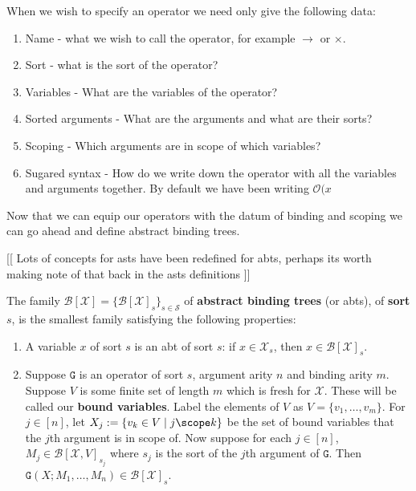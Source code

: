 \begin{remark}\label{opdata}
    When we wish to specify an operator we need only give the following data:
    \begin{enumerate}
        \item Name - what we wish to call the operator, for example $\to$ or $\times$.
        \item Sort - what is the sort of the operator?
        \item Variables - What are the variables of the operator?
        \item Sorted arguments - What are the arguments and what are their sorts?
        \item Scoping - Which arguments are in scope of which variables?
        \item Sugared syntax - How do we write down the operator with all the variables and arguments together. By default we have been writing $\mathcal{O}(x$ 
    \end{enumerate}
\end{remark}

Now that we can equip our operators with the datum of binding and scoping we can go ahead and define abstract binding trees.

[[ Lots of concepts for asts have been redefined for abts,
perhaps its worth making note of that back in the asts definitions ]]

\begin{defin}\label{abt}
    The family $\mathcal{B}[\mathcal{X}] = \{ \mathcal{B}[\mathcal{X}]_s \}_{s \in \mathcal{S}}$ of \textbf{abstract binding trees} (or abts), of \textbf{sort} $s$, is the smallest family satisfying the following properties:
    
    \begin{enumerate}
        \item A variable $x$ of sort $s$ is an abt of sort $s$: if $x \in \mathcal{X}_s$, then $x \in \mathcal{B}[\mathcal{X}]_s$.
        \item Suppose $\mathtt{G}$ is an operator of sort $s$, argument arity $n$ and binding arity $m$. Suppose $V$ is some finite set of length $m$ which is fresh for $\mathcal{X}$. These will be called our \textbf{bound variables}. Label the elements of $V$ as $V= \{ v_1, \dots, v_m\}$. For $j\in [n]$, let $X_j:=\{ v_k \in V \mid j \scope k\}$ be the set of bound variables that the $j$th argument is in scope of. Now suppose for each $j \in [n]$, $M_j \in \mathcal{B}[\mathcal{X},V]_{s_j}$ where $s_j$ is the sort of the $j$th argument of $\mathtt{G}$. Then $\mathtt{G}(X;M_1,\dots, M_n) \in \mathcal{B}[\mathcal{X}]_s$.
    \end{enumerate}
\end{defin}

